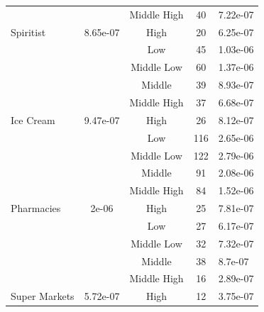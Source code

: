 \documentclass[smallextended]{svjour3}       %
\begin{document}
\begin{table}
\begin{tabular}[t]{lcccl}
 &  & Middle High & 40 & 7.22e-07\\

\multirow{-5}{*}{\raggedright\arraybackslash Spiritist} & \multirow{-5}{*}{\centering\arraybackslash 8.65e-07} & High & 20 & 6.25e-07\\
\cmidrule{1-5}
 &  & Low & 45 & 1.03e-06\\

 &  & Middle Low & 60 & 1.37e-06\\

 &  & Middle & 39 & 8.93e-07\\

 &  & Middle High & 37 & 6.68e-07\\

\multirow{-5}{*}{\raggedright\arraybackslash Ice Cream} & \multirow{-5}{*}{\centering\arraybackslash 9.47e-07} & High & 26 & 8.12e-07\\
\cmidrule{1-5}
 &  & Low & 116 & 2.65e-06\\

 &  & Middle Low & 122 & 2.79e-06\\

 &  & Middle & 91 & 2.08e-06\\

 &  & Middle High & 84 & 1.52e-06\\

\multirow{-5}{*}{\raggedright\arraybackslash Pharmacies} & \multirow{-5}{*}{\centering\arraybackslash 2e-06} & High & 25 & 7.81e-07\\
\cmidrule{1-5}
 &  & Low & 27 & 6.17e-07\\

 &  & Middle Low & 32 & 7.32e-07\\

 &  & Middle & 38 & 8.7e-07\\

 &  & Middle High & 16 & 2.89e-07\\

\multirow{-5}{*}{\raggedright\arraybackslash Super Markets} & \multirow{-5}{*}{\centering\arraybackslash 5.72e-07} & High & 12 & 3.75e-07\\
\bottomrule
\end{tabular}
\end{table}
\end{document}
